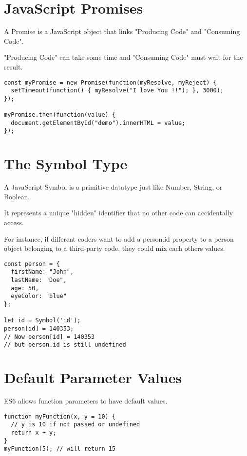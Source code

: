 \documentclass[a4paper,12pt]{article}
\begin{document}
\begin{large}
\section*{JavaScript Promises}

A Promise is a JavaScript object that links "Producing Code" and "Consuming Code".

"Producing Code" can take some time and "Consuming Code" must wait for the result.

\begin{lstlisting}
const myPromise = new Promise(function(myResolve, myReject) {
  setTimeout(function() { myResolve("I love You !!"); }, 3000);
});

myPromise.then(function(value) {
  document.getElementById("demo").innerHTML = value;
});
\end{lstlisting}







\section*{The Symbol Type}

A JavaScript Symbol is a primitive datatype just like Number, String, or Boolean.

It represents a unique "hidden" identifier that no other code can accidentally access.

For instance, if different coders want to add a person.id property to a person object belonging to a third-party code, they could mix each others values.

\begin{lstlisting}
const person = {
  firstName: "John",
  lastName: "Doe",
  age: 50,
  eyeColor: "blue"
};

let id = Symbol('id');
person[id] = 140353;
// Now person[id] = 140353
// but person.id is still undefined
\end{lstlisting}







\section*{Default Parameter Values}

ES6 allows function parameters to have default values.

\begin{lstlisting}
function myFunction(x, y = 10) {
  // y is 10 if not passed or undefined
  return x + y;
}
myFunction(5); // will return 15
\end{lstlisting}








\end{large}
\end{document}
